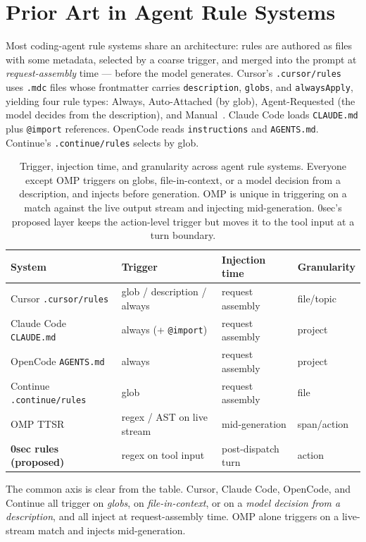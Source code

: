 \documentclass[11pt]{article}
\begin{document}
\section{Prior Art in Agent Rule Systems}
\label{sec:priorart}

Most coding-agent rule systems share an architecture: rules are authored as
files with some metadata, selected by a coarse trigger, and merged into the
prompt at \emph{request-assembly} time --- before the model generates. Cursor's
\texttt{.cursor/rules} uses \texttt{.mdc} files whose frontmatter carries
\texttt{description}, \texttt{globs}, and \texttt{alwaysApply}, yielding four
rule types: Always, Auto-Attached (by glob), Agent-Requested (the model decides
from the description), and Manual~\cite{cursorrules}. Claude Code loads
\texttt{CLAUDE.md} plus \texttt{@import} references. OpenCode reads
\texttt{instructions} and \texttt{AGENTS.md}. Continue's \texttt{.continue/rules}
selects by glob.

\begin{table}[ht]
\centering
\small
\begin{tabular}{llll}
\toprule
System & Trigger & Injection time & Granularity \\
\midrule
Cursor \texttt{.cursor/rules} & glob / description / always & request assembly & file/topic \\
Claude Code \texttt{CLAUDE.md} & always (+ \texttt{@import}) & request assembly & project \\
OpenCode \texttt{AGENTS.md} & always & request assembly & project \\
Continue \texttt{.continue/rules} & glob & request assembly & file \\
OMP TTSR & regex / AST on live stream & mid-generation & span/action \\
\textbf{0sec rules (proposed)} & regex on tool input & post-dispatch turn & action \\
\bottomrule
\end{tabular}
\caption{Trigger, injection time, and granularity across agent rule systems.
Everyone except OMP triggers on globs, file-in-context, or a model decision from
a description, and injects before generation. OMP is unique in triggering on a
match against the live output stream and injecting mid-generation. 0sec's
proposed layer keeps the action-level trigger but moves it to the tool input at a
turn boundary.}
\end{table}

The common axis is clear from the table. Cursor, Claude Code, OpenCode, and
Continue all trigger on \emph{globs}, on \emph{file-in-context}, or on a
\emph{model decision from a description}, and all inject at request-assembly
time. OMP alone triggers on a live-stream match and injects mid-generation.
\end{document}
